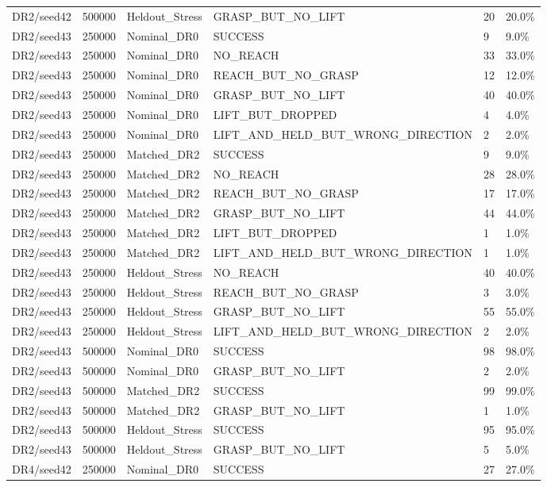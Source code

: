 \documentclass[11pt,a4paper,oneside]{book}
\begin{document}
\begin{longtable}{l l l l l l}
DR2/seed42 & 500000 & Heldout\_Stress & GRASP\_BUT\_NO\_LIFT & 20 & 20.0\% \\
DR2/seed43 & 250000 & Nominal\_DR0 & SUCCESS & 9 & 9.0\% \\
DR2/seed43 & 250000 & Nominal\_DR0 & NO\_REACH & 33 & 33.0\% \\
DR2/seed43 & 250000 & Nominal\_DR0 & REACH\_BUT\_NO\_GRASP & 12 & 12.0\% \\
DR2/seed43 & 250000 & Nominal\_DR0 & GRASP\_BUT\_NO\_LIFT & 40 & 40.0\% \\
DR2/seed43 & 250000 & Nominal\_DR0 & LIFT\_BUT\_DROPPED & 4 & 4.0\% \\
DR2/seed43 & 250000 & Nominal\_DR0 & LIFT\_AND\_HELD\_BUT\_WRONG\_DIRECTION & 2 & 2.0\% \\
DR2/seed43 & 250000 & Matched\_DR2 & SUCCESS & 9 & 9.0\% \\
DR2/seed43 & 250000 & Matched\_DR2 & NO\_REACH & 28 & 28.0\% \\
DR2/seed43 & 250000 & Matched\_DR2 & REACH\_BUT\_NO\_GRASP & 17 & 17.0\% \\
DR2/seed43 & 250000 & Matched\_DR2 & GRASP\_BUT\_NO\_LIFT & 44 & 44.0\% \\
DR2/seed43 & 250000 & Matched\_DR2 & LIFT\_BUT\_DROPPED & 1 & 1.0\% \\
DR2/seed43 & 250000 & Matched\_DR2 & LIFT\_AND\_HELD\_BUT\_WRONG\_DIRECTION & 1 & 1.0\% \\
DR2/seed43 & 250000 & Heldout\_Stress & NO\_REACH & 40 & 40.0\% \\
DR2/seed43 & 250000 & Heldout\_Stress & REACH\_BUT\_NO\_GRASP & 3 & 3.0\% \\
DR2/seed43 & 250000 & Heldout\_Stress & GRASP\_BUT\_NO\_LIFT & 55 & 55.0\% \\
DR2/seed43 & 250000 & Heldout\_Stress & LIFT\_AND\_HELD\_BUT\_WRONG\_DIRECTION & 2 & 2.0\% \\
DR2/seed43 & 500000 & Nominal\_DR0 & SUCCESS & 98 & 98.0\% \\
DR2/seed43 & 500000 & Nominal\_DR0 & GRASP\_BUT\_NO\_LIFT & 2 & 2.0\% \\
DR2/seed43 & 500000 & Matched\_DR2 & SUCCESS & 99 & 99.0\% \\
DR2/seed43 & 500000 & Matched\_DR2 & GRASP\_BUT\_NO\_LIFT & 1 & 1.0\% \\
DR2/seed43 & 500000 & Heldout\_Stress & SUCCESS & 95 & 95.0\% \\
DR2/seed43 & 500000 & Heldout\_Stress & GRASP\_BUT\_NO\_LIFT & 5 & 5.0\% \\
DR4/seed42 & 250000 & Nominal\_DR0 & SUCCESS & 27 & 27.0\% \\

\end{longtable}
\end{document}
